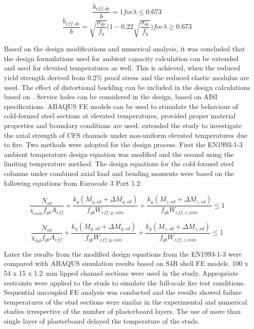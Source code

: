 \begin{equation}
\dfrac{b_{eff,de}}{b}= 1 for \lambda \leq 0.673
\end{equation}
\begin{equation}
\dfrac{b_{eff,de}}{b}= \sqrt{\dfrac{\sigma_{de}}{f_y}}\bigg(1-0.22\sqrt{\dfrac{\sigma_{de}}{f_y}}\bigg) for \lambda \geq 0.673
\end{equation}

Based on the design modifications and numerical analysis, it was concluded that the design formulations used for ambient capacity calculation can be extended and used for elevated temperatures as well. This is achieved, when the reduced yield strength derived from 0.2\% proof stress and the reduced elastic modulus are used. The effect of distortional buckling can be included in the design calculations based on \citet{Young1992}. Service holes can be considered in the design, based on AISI specifications. ABAQUS FE models can be used to stimulate the behaviour of cold-formed steel sections at elevated temperatures, provided proper material properties and boundary conditions are used. \citet{Feng2003} extended the study to investigate the axial strength of CFS channels under non-uniform elevated temperatures due to fire. Two methods were adopted for the design process. First the EN1993-1-3 ambient temperature design equation was modified and the second using the limiting temperature method. The design equations for the cold-formed steel columns under combined axial load and bending moments were based on the following equations from Eurocode 3 Part 1.2.

\begin{equation}
\dfrac{N_{sd}}{\chi_{min}f_{yb}A_{eff}}+\dfrac{k_y(M_{y,sd}+\Delta M_{y,sd})}{f_{yb}W_{eff,y,com}}+\dfrac{k_y(M_{z,sd}+\Delta M_{z,sd})}{f_{yb}W_{eff,z,com}} \leq 1
\end{equation}

\begin{equation}
\dfrac{N_{sd}}{\chi_{lat}f_{yb}A_{eff}}+\dfrac{k_y(M_{y,sd}+\Delta M_{y,sd})}{f_{yb}W_{eff,y,com}}+\dfrac{k_y(M_{z,sd}+\Delta M_{z,sd})}{f_{yb}W_{eff,z,com}} \leq 1
\end{equation}

Later the results from the modified design equations from the EN1993-1-3 were compared with ABAQUS simulation results based on S4R shell FE models. 100 x 54 x 15 x 1.2~mm lipped channel sections were used in the study. Appropriate restraints were applied to the studs to simulate the full-scale fire test conditions. Sequential uncoupled FE analysis was conducted and the results showed failure temperatures of the stud sections were similar in the experimental and numerical studies irrespective of the number of plasterboard layers. The use of more than single layer of plasterboard delayed the temperature of the studs. 

